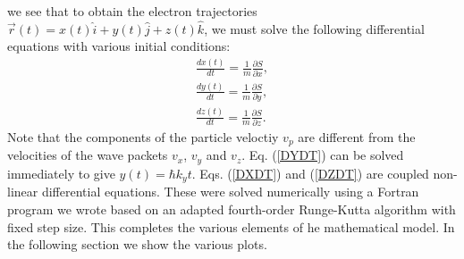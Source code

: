 \documentclass[12pt]{article}       %
\newcommand{\rb}{\mbox{$\vec{r}$}}
\begin{document}
we see that to obtain the electron trajectories  $\rb(t)=x(t)\hat{i}+y(t)\hat{j}+z(t)\hat{k}$, we must solve the following differential equations with various initial conditions:
\begin{eqnarray}
\frac{dx(t)}{dt} =\frac{1}{m}\frac{\partial S}{\partial x}, \label{DXDT}\\
\frac{dy(t)}{dt} =\frac{1}{m}\frac{\partial S}{\partial y}, \label{DYDT}\\
\frac{dz(t)}{dt} =\frac{1}{m}\frac{\partial S}{\partial z}. \label{DZDT}
\end{eqnarray}
Note that the components of the particle veloctiy $v_p$  are different from the velocities of the wave packets $v_x$, $v_y$ and $v_z$. Eq. (\ref{DYDT}) can be solved immediately to give $y(t)=\hbar k_y t$. Eqs. (\ref{DXDT}) and (\ref{DZDT}) are coupled non-linear differential equations. These were solved numerically using  a Fortran program we wrote based on an adapted fourth-order Runge-Kutta algorithm \cite{BF89} with fixed step size. This completes the various elements  of he mathematical model. In the following section we show the various plots.  
\end{document}
